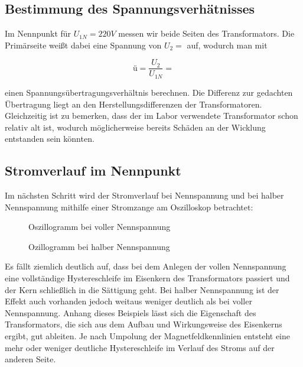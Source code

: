 \documentclass{article}
\begin{document}
\subsection{Bestimmung des Spannungsverhätnisses}
\label{sec:best-des-spann}

Im Nennpunkt für $U_{1N} = 220V$ messen wir beide Seiten des Transformators. Die Primärseite weißt dabei eine Spannung von $U_{2} = $ auf, wodurch man mit

\begin{equation*}
  \label{eq:2}
  ü = \frac{U_{2}}{U_{1N}} =
\end{equation*}

einen Spannungsübertragungsverhältnis berechnen. Die Differenz zur gedachten Übertragung liegt an den Herstellungsdifferenzen der Transformatoren. Gleichzeitig ist zu bemerken, dass der im Labor verwendete Transformator schon relativ alt ist, wodurch möglicherweise bereits Schäden an der Wicklung entstanden sein könnten.


\subsection{Stromverlauf im Nennpunkt}
\label{sec:stromv-im-nennp}

Im nächsten Schritt wird der Stromverlauf bei Nennspannung und bei halber Nennspannung mithilfe einer Stromzange am Oszilloskop betrachtet:

\begin{figure}[h]
  \centering

  \caption{Oszillogramm bei voller Nennspannung}
  \label{fig:vollnennstrom}
\end{figure}

\begin{figure}[h]
  \centering

  \caption{Ozillogramm bei halber Nennspannung}
  \label{fig:halbnennstrom}
\end{figure}

Es fällt ziemlich deutlich auf, dass bei dem Anlegen der vollen Nennspannung eine vollständige Hystereschleife im Eisenkern des Transformators passiert und der Kern schließlich in die Sättigung geht. Bei halber Nennspannung ist der Effekt auch vorhanden jedoch weitaus weniger deutlich als bei voller Nennspannung. Anhang dieses Beispiels lässt sich die Eigenschaft des Transformators, die sich aus dem Aufbau und Wirkungsweise des Eisenkerns ergibt, gut ableiten. Je nach Umpolung der Magnetfeldkennlinien entsteht eine mehr oder weniger deutliche Hystereschleife im Verlauf des Stroms auf der anderen Seite.
\end{document}
